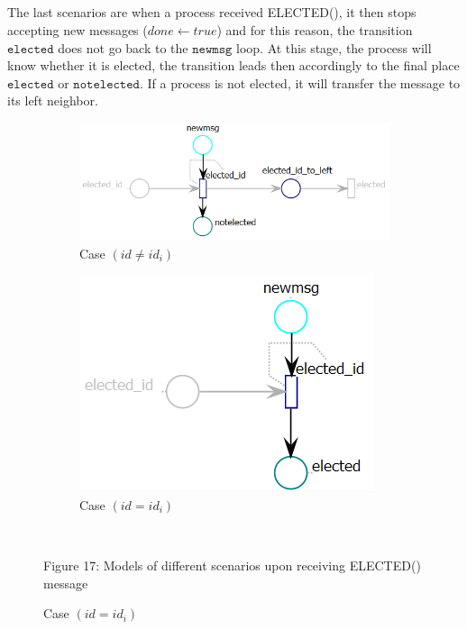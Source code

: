 \documentclass{article}
\begin{document}
	\subparagraph{}The last scenarios are when a process received ELECTED(), it then stops accepting new messages ($done \leftarrow true$) and for this reason, the transition $\mathtt{elected}$ does not go back to the $\mathtt{newmsg}$ loop. At this stage, the process will know whether it is elected, the transition leads then accordingly to the final place $\mathtt{elected}$ or $\mathtt{notelected}$. If a process is not elected, it will transfer the message to its left neighbor.
	\begin{figure}[ht] 
		\begin{subfigure}[b]{1\linewidth}
			\centering
			\hspace*{20pt}
			\includegraphics[scale=0.6]{elected_cas1} 
			\caption{Case $(id\neq id_i)$} 
			\label{fig15:a} 
		\end{subfigure}
		\begin{subfigure}[b]{1\linewidth}
			\vspace*{20pt}
			\centering
			\hspace*{-90pt}
			\includegraphics[scale=0.6]{elected_cas2} 
			\caption{Case $(id=id_i)$} 
			\label{fig15:b} 
		\end{subfigure} 
		\\\begin{center}
			Figure 17: Models of different scenarios upon receiving ELECTED() message
		\end{center}
		\label{fig15} 
	\end{figure}
\end{document}
